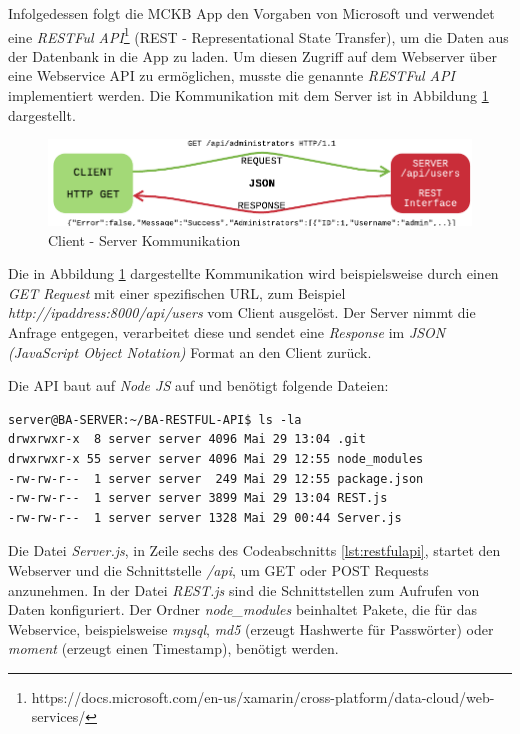 	Infolgedessen folgt die MCKB App den Vorgaben von Microsoft und verwendet eine \textit{RESTFul API}\footnote{https://docs.microsoft.com/en-us/xamarin/cross-platform/data-cloud/web-services/} (REST - Representational State Transfer), um die Daten aus der Datenbank in die App zu laden. Um diesen Zugriff auf dem Webserver über eine Webservice API zu ermöglichen, musste die genannte \textit{RESTFul API} implementiert werden. Die Kommunikation mit dem Server ist in Abbildung \ref{fig:restfulcommunication} dargestellt.

	\begin{figure}[h!]
		\centering
		\includegraphics[width=1\textwidth]{images/restfull-communication.png}
		\caption{Client - Server Kommunikation}
		\label{fig:restfulcommunication}
	\end{figure}

	Die in Abbildung \ref{fig:restfulcommunication} dargestellte Kommunikation wird beispielsweise durch einen \textit{GET Request} mit einer spezifischen URL, zum Beispiel \textit{http://ipaddress:8000/api/users} vom Client ausgelöst. Der Server nimmt die Anfrage entgegen, verarbeitet diese und sendet eine \textit{Response} im \textit{JSON (JavaScript Object Notation)} Format an den Client zurück.

	Die API baut auf \textit{Node JS} auf und benötigt folgende Dateien:

	\begin{lstlisting}[caption={Webservice Aufbau},label={lst:restfulapi},captionpos=b,style=BashInputStyle]
server@BA-SERVER:~/BA-RESTFUL-API$ ls -la
drwxrwxr-x  8 server server 4096 Mai 29 13:04 .git
drwxrwxr-x 55 server server 4096 Mai 29 12:55 node_modules
-rw-rw-r--  1 server server  249 Mai 29 12:55 package.json
-rw-rw-r--  1 server server 3899 Mai 29 13:04 REST.js
-rw-rw-r--  1 server server 1328 Mai 29 00:44 Server.js
	\end{lstlisting}
	
	Die Datei \textit{Server.js}, in Zeile sechs des Codeabschnitts \ref{lst:restfulapi}, startet den Webserver und die Schnittstelle \textit{/api}, um GET oder POST Requests anzunehmen. In der Datei \textit{REST.js} sind die Schnittstellen zum Aufrufen von Daten konfiguriert. Der Ordner \textit{node\_modules} beinhaltet Pakete, die für das Webservice, beispielsweise \textit{mysql}, \textit{md5} (erzeugt Hashwerte für Passwörter) oder \textit{moment} (erzeugt einen Timestamp), benötigt werden.

